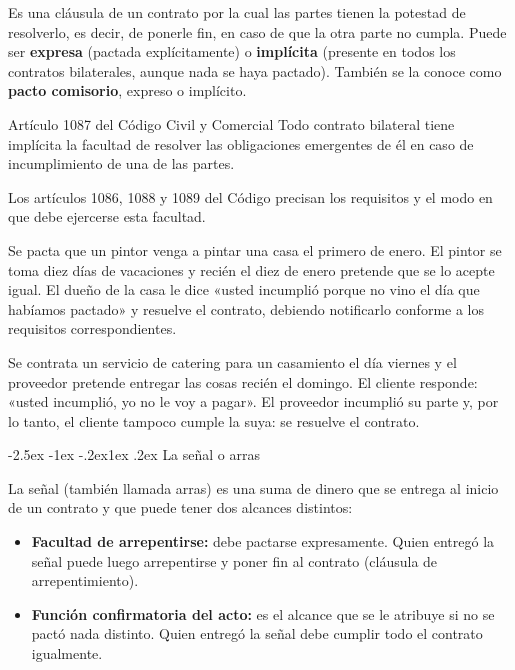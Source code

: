 \documentclass[12pt,oneside]{book}
\makeatletter
\renewcommand\subsection{\@startsection{subsection}{2}{\z@}%
  {-2.5ex \@plus -1ex \@minus -.2ex}{1ex \@plus .2ex}%
  {\normalfont\normalsize\bfseries}}
\makeatother
\begin{document}
Es una cláusula de un contrato por la cual las partes tienen la potestad de resolverlo, es decir, de ponerle fin, en caso de que la otra parte no cumpla. Puede ser \textbf{expresa} (pactada explícitamente) o \textbf{implícita} (presente en todos los contratos bilaterales, aunque nada se haya pactado). También se la conoce como \textbf{pacto comisorio}, expreso o implícito.

\begin{articulo}{Artículo 1087 del Código Civil y Comercial}
Todo contrato bilateral tiene implícita la facultad de resolver las obligaciones emergentes de él en caso de incumplimiento de una de las partes.
\end{articulo}

Los artículos 1086, 1088 y 1089 del Código precisan los requisitos y el modo en que debe ejercerse esta facultad.


\begin{ejemplo}
Se pacta que un pintor venga a pintar una casa el primero de enero. El pintor se toma diez días de vacaciones y recién el diez de enero pretende que se lo acepte igual. El dueño de la casa le dice «usted incumplió porque no vino el día que habíamos pactado» y resuelve el contrato, debiendo notificarlo conforme a los requisitos correspondientes.
\end{ejemplo}

\begin{ejemplo}
Se contrata un servicio de catering para un casamiento el día viernes y el proveedor pretende entregar las cosas recién el domingo. El cliente responde: «usted incumplió, yo no le voy a pagar». El proveedor incumplió su parte y, por lo tanto, el cliente tampoco cumple la suya: se resuelve el contrato.
\end{ejemplo}

\subsection{La señal o arras}

La señal (también llamada arras) es una suma de dinero que se entrega al inicio de un contrato y que puede tener dos alcances distintos:

\begin{itemize}
    \item \textbf{Facultad de arrepentirse:} debe pactarse expresamente. Quien entregó la señal puede luego arrepentirse y poner fin al contrato (cláusula de arrepentimiento).
    \item \textbf{Función confirmatoria del acto:} es el alcance que se le atribuye si no se pactó nada distinto. Quien entregó la señal debe cumplir todo el contrato igualmente.
\end{itemize}
\end{document}
